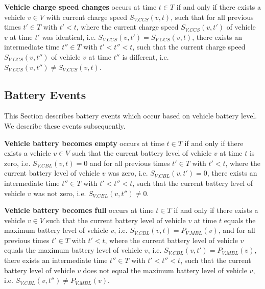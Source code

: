 \documentclass[graybox]{svmult}
\begin{document}
\vspace{4mm}
\noindent
\textbf{Vehicle charge speed changes}
occurs at time $t \in T$ if and only if there exists a vehicle $v \in V$ with current charge speed $S_{V.CCS}(v, t)$, such that for all previous times $t' \in T$ with $t' < t$, where the current charge speed $S_{V.CCS}(v,t')$ of vehicle $v$ at time $t'$ was identical, i.e. $S_{V.CCS}(v,t') = S_{V.CCS}(v,t)$, there exists an intermediate time $t'' \in T$ with $t' < t'' < t$, such that the current charge speed $S_{V.CCS}(v,t'')$ of vehicle $v$ at time $t''$ is different, i.e. $S_{V.CCS}(v,t'') \neq S_{V.CCS}(v,t)$.

\vspace{-2mm}

\noindent
\subsection{Battery Events}
\label{sec:battery-events}
This Section describes battery events which occur based on vehicle battery level. We describe these events subsequently.
\vspace{4mm}

\noindent
\textbf{Vehicle battery becomes empty}
occurs at time $t \in T$ if and only if there exists a vehicle $v \in V$ such that the current battery level of vehicle $v$ at time $t$ is zero, i.e. $S_{V.CBL}(v,t) = 0$ and for all previous times $t' \in T$ with $t' < t$, where the current battery level of vehicle $v$ was zero, i.e. $S_{V.CBL}(v,t') = 0$, there exists an intermediate time $t'' \in T$ with $t' < t'' < t$, such that the current battery level of vehicle $v$ was not zero, i.e. $S_{V.CBL}(v,t'') \neq 0$.

\vspace{4mm}
\noindent
\textbf{Vehicle battery becomes full}
occurs at time $t \in T$ if and only if there exists a vehicle $v \in V$ such that the current battery level of vehicle $v$ at time $t$ equals the maximum battery level of vehicle $v$, i.e. $S_{V.CBL}(v,t) = P_{V.MBL}(v)$, and for all previous times $t' \in T$ with $t' < t$, where the current battery level of vehicle $v$ equals the maximum battery level of vehicle $v$, i.e. $S_{V.CBL}(v,t') = P_{V.MBL}(v)$, there exists an intermediate time $t'' \in T$ with $t' < t'' < t$, such that the current battery level of vehicle $v$ does not equal the maximum battery level of vehicle $v$, i.e. $S_{V.CBL}(v,t'') \neq P_{V.MBL}(v)$.
\end{document}
